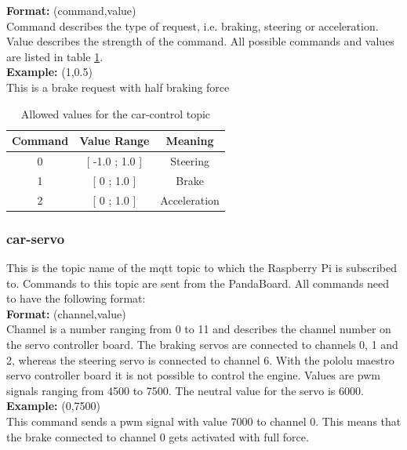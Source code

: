 \textbf{Format:} (command,value) \\
Command describes the type of request, i.e. braking, steering or acceleration. Value describes the strength of the command. All possible commands and values are listed in table \ref{tab:car-control}. \\

\textbf{Example:} (1,0.5) \\
This is a brake request with half braking force \\

\begin{table}[h]
    \centering
    \begin{tabular}{c | c | c}
        \textbf{Command} & \textbf{Value Range} & \textbf{Meaning} \\ \hline
        0   &   [ -1.0 ; 1.0 ]    & Steering \\
        1   &   [ 0 ; 1.0 ]       & Brake \\ 
        2   &   [ 0 ; 1.0 ]       & Acceleration \\ 
    \end{tabular}
    \caption{Allowed values for the car-control topic}
    \label{tab:car-control}
\end{table}


\subsubsection{car-servo}
\label{sec:mqtt-car-servo}
This is the topic name of the mqtt topic to which the Raspberry Pi is subscribed to. Commands to this topic are sent from the PandaBoard. All commands need to have the following format: \\ 

\textbf{Format:} (channel,value) \\
Channel is a number ranging from 0 to 11 and describes the channel number on the servo controller board. The braking servos are connected to channels 0, 1 and 2, whereas the steering servo is connected to channel 6. With the pololu maestro servo controller board it is not possible to control the engine. Values are pwm signals ranging from 4500 to 7500. The neutral value for the servo is 6000. \\

\textbf{Example:} (0,7500) \\
This command sends a pwm signal with value 7000 to channel 0. This means that the brake connected to channel 0 gets activated with full force. 

